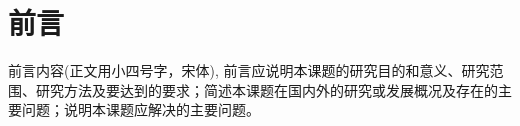 \section[前言]{前{\hspace{\ccwd}}言}


前言内容(正文用小四号字，宋体), 前言应说明本课题的研究目的和意义、研究范围、研究方法及要达到的要求；简述本课题在国内外的研究或发展概况及存在的主要问题；说明本课题应解决的主要问题。